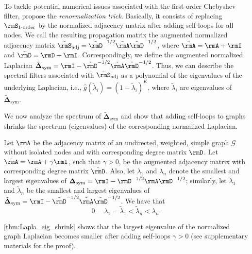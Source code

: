 To tackle potential numerical issues associated with the first-order Chebyshev filter, \citet{gcn} propose the \textit{renormalization trick}. Basically, it consists of replacing $\rmS_{\text{1-order}}$ by the normalized adjacency matrix after adding self-loops for all nodes. We call the resulting propagation matrix the augmented normalized adjacency matrix $\tilde{\rmS}_{\text{adj}} = \tilde{\rmD}^{-1/2}\tilde{\rmA}\tilde{\rmD}^{-1/2}$, where $\tilde{\rmA}=\rmA+\rmI$ and $\tilde{\rmD}=\rmD+\rmI$. Correspondingly, we define the augmented normalized Laplacian $\tilde{\boldsymbol{\Delta}}_{\text{sym}} = \rmI -  \tilde{\rmD}^{-1/2}\tilde{\rmA}\tilde{\rmD}^{-1/2}$. Thus, we can describe the spectral filters associated with $\tilde{\rmS}_{\text{adj}}$ as a polynomial of the eigenvalues of the underlying Laplacian, i.e.,  $\hat{g}(\tilde{\lambda}_i) = (1 - \tilde{\lambda}_i)^K$, where $\tilde{\lambda}_i$ are eigenvalues of $\tilde{\boldsymbol{\Delta}}_{\text{sym}}$.


We now analyze the spectrum of $\tilde{\boldsymbol{\Delta}}_{\text{sym}}$ and show that adding self-loops to graphs shrinks the spectrum (eigenvalues) of the corresponding normalized Laplacian.

\begin{theorem}\label{thm:Lapla_eig_shrink} Let $\rmA$ be the adjacency matrix of an undirected, weighted, simple graph $\mathcal{G}$ without isolated nodes and with corresponding degree matrix $\rmD$. Let $\tilde{\rmA} = \rmA + \gamma \rmI$, such that $\gamma > 0$, be the augmented adjacency matrix with corresponding degree matrix $\tilde{\rmD}$. Also, let $\lambda_1$ and $\lambda_n$ denote the smallest and largest eigenvalues of $\boldsymbol{\Delta}_{\text{sym}}=\rmI -  \rmD^{-1/2}\rmA\rmD^{-1/2}$; similarly, let $\tilde{\lambda}_1$ and $\tilde{\lambda}_n$ be the smallest and largest eigenvalues of $\tilde{\boldsymbol{\Delta}}_{\text{sym}}=\rmI -  \tilde{\rmD}^{-1/2}\tilde{\rmA}\tilde{\rmD}^{-1/2}$. We have that
\begin{equation}
0 = \lambda_1 = \tilde{\lambda}_1 < \tilde{\lambda}_n < \lambda_n. \label{eq:corollary_aug_laplacian}
\end{equation}
\end{theorem}
%
\autoref{thm:Lapla_eig_shrink} shows that the largest eigenvalue of the normalized graph Laplacian becomes smaller after adding self-loops $\gamma > 0$ (see supplementary materials for the proof).

